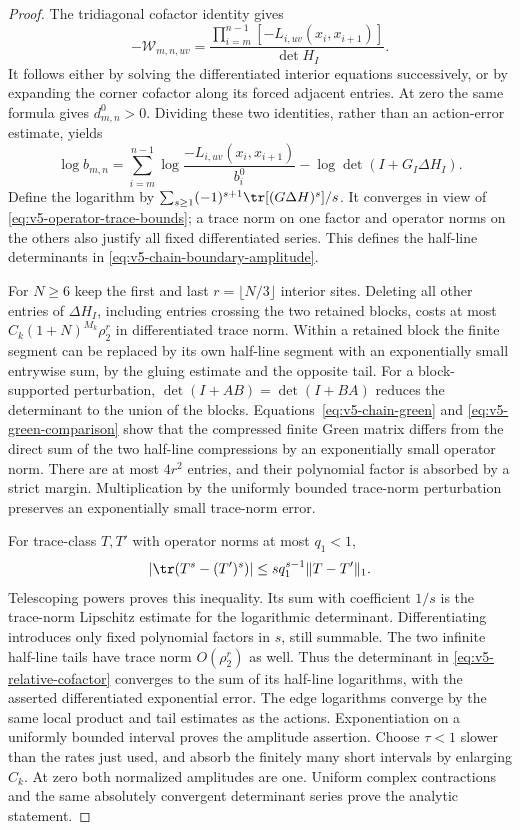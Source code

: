 \begin{proof}
The tridiagonal cofactor identity gives
\[
 -\mathcal W_{m,n,uv}
 =\frac{\prod_{i=m}^{n-1}[-L_{i,uv}(x_i,x_{i+1})]}{\det H_I}.
\]
It follows either by solving the differentiated interior equations
successively, or by expanding the corner cofactor along its forced
adjacent entries. At zero the same formula gives $d^0_{m,n}>0$.
Dividing these two identities, rather than an action-error estimate,
yields
\begin{equation}\label{eq:v5-relative-cofactor}
 \log b_{m,n}=
 \sum_{i=m}^{n-1}\log\frac{-L_{i,uv}(x_i,x_{i+1})}{b_i^0}
 -\log\det(I+G_I\Delta H_I).
\end{equation}
Define the logarithm by
$\sum_{s\ge1}(-1)^{s+1}\tr[(G\Delta H)^s]/s$.
It converges in view of \eqref{eq:v5-operator-trace-bounds}; a trace
norm on one factor and operator norms on the others also justify all
fixed differentiated series. This defines the half-line determinants
in \eqref{eq:v5-chain-boundary-amplitude}.

For $N\ge6$ keep the first and last $r=\lfloor N/3\rfloor$ interior
sites. Deleting all other entries of $\Delta H_I$, including entries
crossing the two retained blocks, costs at most
$C_k(1+N)^{M_k}\rho_2^r$ in differentiated trace norm. Within a
retained block the finite segment can be replaced by its own half-line
segment with an exponentially small entrywise sum, by the gluing
estimate and the opposite tail. For a block-supported perturbation,
$\det(I+AB)=\det(I+BA)$ reduces the determinant to the union of the
blocks. Equations~\eqref{eq:v5-chain-green} and
\eqref{eq:v5-green-comparison} show that the compressed finite Green
matrix differs from the direct sum of the two half-line compressions
by an exponentially small operator norm. There are at most $4r^2$
entries, and their polynomial factor is absorbed by a strict margin.
Multiplication by the uniformly bounded trace-norm perturbation
preserves an exponentially small trace-norm error.

For trace-class $T,T'$ with operator norms at most $q_1<1$,
\[
 |\tr(T^s-(T')^s)|\le s q_1^{s-1}\|T-T'\|_1.
\]
Telescoping powers proves this inequality. Its sum with coefficient
$1/s$ is the trace-norm Lipschitz estimate for the logarithmic
determinant. Differentiating introduces only fixed polynomial factors
in $s$, still summable. The two infinite half-line tails have trace
norm $O(\rho_2^r)$ as well. Thus the determinant in
\eqref{eq:v5-relative-cofactor} converges to the sum of its half-line
logarithms, with the asserted differentiated exponential error.
The edge logarithms converge by the same local product and tail
estimates as the actions. Exponentiation on a uniformly bounded
interval proves the amplitude assertion. Choose $\tau<1$ slower than
the rates just used, and absorb the finitely many short intervals by
enlarging $C_k$. At zero both normalized amplitudes are one. Uniform
complex contractions and the same absolutely convergent determinant
series prove the analytic statement.
\end{proof}

